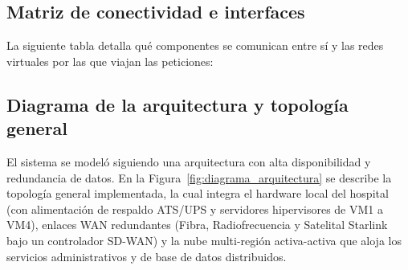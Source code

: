 \documentclass[11pt,a4paper]{article}
\begin{document}
\subsection{Matriz de conectividad e interfaces}
La siguiente tabla detalla qué componentes se comunican entre sí y las redes virtuales por las que viajan las peticiones:

\begin{table}[h!]
\centering
\small
{}
\caption{Matriz de conectividad de la infraestructura distribuida.}
\label{tab:conectividad}
\end{table}

\subsection{Diagrama de la arquitectura y topología general}
El sistema se modeló siguiendo una arquitectura con alta disponibilidad y redundancia de datos. En la Figura~\ref{fig:diagrama_arquitectura} se describe la topología general implementada, la cual integra el hardware local del hospital (con alimentación de respaldo ATS/UPS y servidores hipervisores de VM1 a VM4), enlaces WAN redundantes (Fibra, Radiofrecuencia y Satelital Starlink bajo un controlador SD-WAN) y la nube multi-región activa-activa que aloja los servicios administrativos y de base de datos distribuidos.
\end{document}
